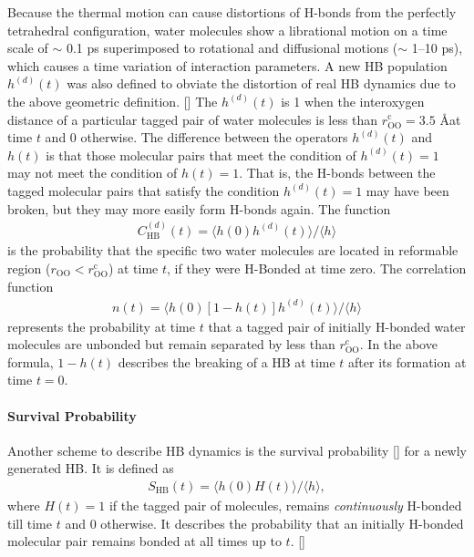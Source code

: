 %
Because the thermal motion can cause distortions of H-bonds from the perfectly tetrahedral configuration,
water molecules show a librational motion on a time scale of $\sim$ 0.1 ps superimposed to rotational and diffusional motions ($\sim$ 1--10 ps), 
which causes a time variation of interaction parameters.
A new HB population $h^{(d)}(t)$ was also defined to obviate the distortion of real HB dynamics
due to the above geometric definition. [\cite{Sciortino1989,AC00}]
The $h^{(d)}(t)$ is 1 when the interoxygen distance of a particular tagged pair of water molecules is less than $r^{\text{c}}_{\text{OO}}=3.5$ \AA at time $t$ and 0 otherwise. 
The difference between the operators $h^{(d)}(t)$ and $h(t)$ is that those molecular pairs that meet the condition of $h^{(d)}(t)=1$ may not meet the condition of $h(t)=1$.
That is, the H-bonds between the tagged molecular pairs that satisfy the condition $h^{(d)}(t)=1$ may have been broken, but they may more easily form H-bonds again.
The function 
\begin{eqnarray}
  C^{(d)}_{\text{HB}}(t)=\langle h(0)h^{(d)}(t) \rangle/\langle h\rangle
\label{eq:C_HB_d}
\end{eqnarray}
is the probability that the specific two water molecules are located in reformable region ($r_{\text{OO}} < r^{\text{c}}_{\text{OO}}$) at time $t$,
if they were H-Bonded at time zero. 
The correlation function 
%
\begin{eqnarray}
n(t)=\langle h(0)[1-h(t)]h^{(d)}(t) \rangle/\langle h\rangle 
\label{eq:n_HB}
\end{eqnarray}
represents the probability at time $t$ 
that a tagged pair of initially H-bonded water molecules are unbonded but remain separated by less than $r_{\text{OO}}^{\text{c}}$.
In the above formula, $1-h(t)$ describes the breaking of a HB at time $t$ after its formation at time $t=0$.
\paragraph{Survival Probability}
Another scheme to describe HB dynamics is the survival probability [\cite{AC00}] for a newly generated HB.
It is defined as
\begin{eqnarray}
S_{\text{HB}}(t)=\langle h(0)H(t) \rangle/\langle h\rangle 
\label{eq:S_HB},
\end{eqnarray}
where $H(t)=1$ if the tagged pair of molecules, remains \emph{continuously} H-bonded till time $t$ 
and 0 otherwise.  It describes the probability that an initially H-bonded molecular pair 
remains bonded at all times up to $t$. [\cite{Chowdhuri2006}]

